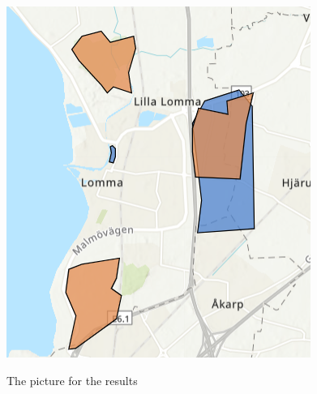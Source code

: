 \begin{figure}[H]
\caption{The picture for the results}
\centering
\includegraphics[scale=0.7]{yes.png}
\label{yes}
\end{figure}




